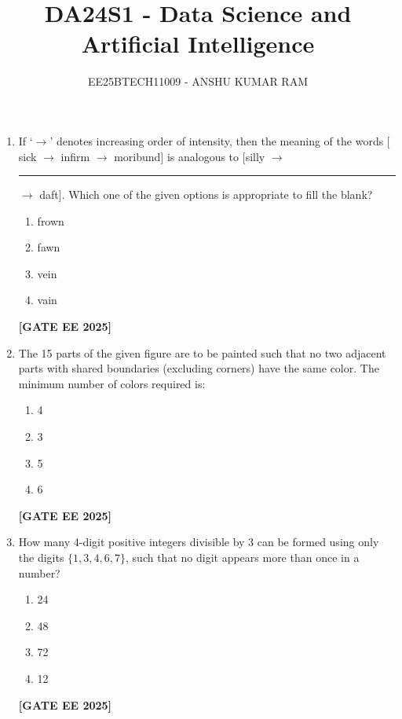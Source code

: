 \documentclass[journal]{IEEEtran}
\newcommand{\qfooter}{%
  \begin{flushright}\footnotesize\textbf{[GATE EE 2025]}\end{flushright}\vspace{1em}%
}
\begin{document}

\vspace{3cm}
\title{DA24S1 - Data Science and Artificial Intelligence}
\author{EE25BTECH11009 - ANSHU KUMAR RAM}
{\let\newpage\relax\maketitle}


\begin{enumerate}[leftmargin=*,label=\arabic*.]
\item If ‘$\rightarrow$’ denotes increasing order of intensity, then the meaning of the words $[$sick $\rightarrow$ infirm $\rightarrow$ moribund$]$ is analogous to $[$silly $\rightarrow$ \rule{6em}{0.05em} $\rightarrow$ daft$]$.
Which one of the given options is appropriate to fill the blank?
\begin{multicols}{2}
\begin{enumerate}[label=(\Alph*)]
\item frown
\item fawn
\item vein
\item vain
\end{enumerate}
\qfooter
\end{multicols}

\item The 15 parts of the given figure are to be painted such that no two adjacent parts with shared boundaries (excluding corners) have the same color. The minimum number of colors required is:
\begin{multicols}{2}
\begin{enumerate}[label=(\Alph*)]
\item 4
\item 3
\item 5
\item 6
\end{enumerate}
\qfooter
\end{multicols}

\item How many 4-digit positive integers divisible by 3 can be formed using only the digits $\{1,3,4,6,7\}$, such that no digit appears more than once in a number?
\begin{multicols}{2}
\begin{enumerate}[label=(\Alph*)]
\item 24
\item 48
\item 72
\item 12
\end{enumerate}
\qfooter
\end{multicols}


\end{enumerate}
\end{document}
